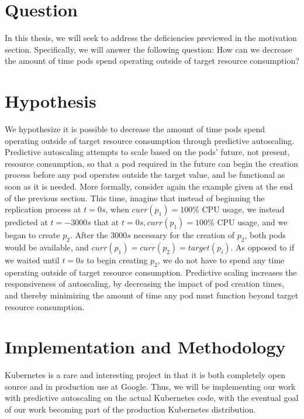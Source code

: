 \documentclass[letterpaper,11pt,twocolumn]{article}
\begin{document}
\section{Question}

In this thesis, we will seek to address the deficiencies previewed in the
motivation section. Specifically, we will answer the following question:
How can we decrease the amount of time pods spend operating outside of target
resource consumption?

\section{Hypothesis}

We hypothesize it is possible to decrease the amount of time pods spend
operating outside of target resource consumption through predictive autoscaling.
Predictive autoscaling attempts to scale based on the pods' future, not present, resource
consumption, so that a pod required in the future can begin
the creation process before any pod operates outside the target value,
and be functional as soon as it is needed.
More formally, consider again the example given at the end of the previous
section.
This time, imagine that instead of beginning the replication process at
$t = 0s$, when $curr(p_{1}) = 100\%$ CPU usage, we instead predicted at
$t = -3000s$ that at $t = 0s, curr(p_{1}) = 100\%$ CPU usage, and we began to
create $p_{2}$. After the $3000s$ necessary for the creation of $p_{2}$, both
pods would be available, and $curr(p_{1}) = curr(p_{2}) = target(p_{i})$. As
opposed to if we waited until $t = 0s$ to begin creating $p_{2}$, we do not have
to spend any time operating outside of target resource consumption. Predictive
scaling increases the responsiveness of autoscaling, by decreasing the impact of
pod creation times, and thereby minimizing the amount of time any pod must
function beyond target resource consumption.

\section{Implementation and Methodology}

Kubernetes is a rare and interesting project in that it is both completely open
source and in production use at Google.\cite{google-container-engine}
Thus, we will be implementing our work
with predictive autoscaling on the actual Kubernetes code, with the eventual
goal of our work becoming part of the production Kubernetes distribution.
\end{document}
